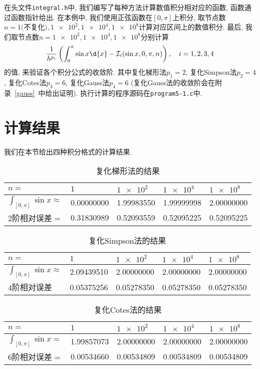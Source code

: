 \documentclass[a4paper]{ctexart}
\theoremstyle{plain}
\begin{document}
在头文件\verb|integral.h|中, 我们编写了每种方法计算数值积分相对应的函数, 函数通过函数指针给出.
在本例中, 我们使用正弦函数在$[0,\pi]$上积分, 取节点数$n=1\text{(不复化)},\num{1e2},\num{1e4},\num{1e8}$计算对应区间上的数值积分.
最后, 我们取节点数$n=\num{1e2},\num{1e4},\num{1e8}$分别计算
\[\frac{1}{h^{p_i}}\left(\int_0^\pi\sin{x}\d{x}-\mathcal{I}_i(\sin{x},0,\pi,n)\right),\quad i=1,2,3,4\]
的值, 来验证各个积分公式的收敛阶.
其中复化梯形法$p_1=2$, 复化Simpson法$p_2=4$, 复化Cotes法$p_3=6$, 复化Gauss法$p_4=6$ (复化Gauss法的收敛阶会在附录~\ref{gauss}~中给出证明).
执行计算的程序源码在\verb|program5-1.c|中.


\section{计算结果}

我们在本节给出四种积分格式的计算结果.

\begin{table}[H]
    \centering
    \begin{tabular}{|l|l|l|l|l|}
    \hline
    $n=$ & $1$ & $\num{1e2}$ & $\num{1e4}$ & $\num{1e8}$ \\ \hline
    $\int_{[0,\pi]}\sin{x}\approx$ & 0.00000000 & 1.99983550 & 1.99999998 & 2.00000000 \\[4pt] \hline
    $2$阶相对误差$=$ & 0.31830989 & 0.52093559 & 0.52095225 & 0.52095225 \\ \hline
    \end{tabular}
    \caption{复化梯形法的结果}
\end{table}

\begin{table}[H]
    \centering
    \begin{tabular}{|l|l|l|l|l|}
    \hline
    $n=$ & $1$ & $\num{1e2}$ & $\num{1e4}$ & $\num{1e8}$ \\ \hline
    $\int_{[0,\pi]}\sin{x}\approx$ & 2.09439510 & 2.00000000 & 2.00000000 & 2.00000000 \\ \hline
    $4$阶相对误差 & 0.05375256 & 0.05278350 & 0.05278350 & 0.05278350 \\ \hline
    \end{tabular}
    \caption{复化Simpson法的结果}
\end{table}

\begin{table}[H]
    \centering
    \begin{tabular}{|l|l|l|l|l|}
    \hline
    $n=$ & $1$ & $\num{1e2}$ & $\num{1e4}$ & $\num{1e8}$ \\ \hline
    $\int_{[0,\pi]}\sin{x}=$ & 1.99857073 & 2.00000000 & 2.00000000 & 2.00000000 \\ \hline
    $6$阶相对误差$=$ & 0.00534660 & 0.00534809 & 0.00534809 & 0.00534809 \\ \hline
    \end{tabular}
    \caption{复化Cotes法的结果}
\end{table}
\end{document}
